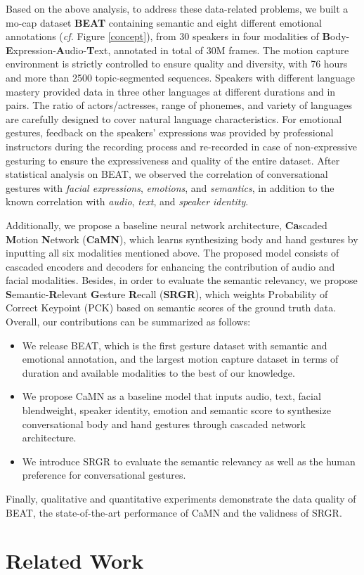\documentclass[runningheads]{llncs}
\begin{document}
Based on the above analysis, to address these data-related problems, we built a mo-cap dataset \textbf{BEAT} containing semantic and eight different emotional annotations (\textit{cf.} Figure \ref{concept}), from 30 speakers in four modalities of \textbf{B}ody-\textbf{E}xpression-\textbf{A}udio-\textbf{T}ext, annotated in total of 30M frames. 
The motion capture environment is strictly controlled to ensure quality and diversity, with 76 hours and more than 2500 topic-segmented sequences. Speakers with different language mastery provided data in three other languages at different durations and in pairs. The ratio of actors/actresses, range of phonemes, and variety of languages are carefully designed to cover natural language characteristics. For emotional gestures, feedback on the speakers' expressions was provided by professional instructors during the recording process and re-recorded in case of non-expressive gesturing to ensure the expressiveness and quality of the entire dataset.
After statistical analysis on BEAT, we observed the correlation of conversational gestures with \textit{facial expressions}, \textit{emotions}, and \textit{semantics}, in addition to the known correlation with \textit{audio}, \textit{text}, and \textit{speaker identity}.  

Additionally, we propose a baseline neural network architecture,  \textbf{Ca}scaded \textbf{M}otion \textbf{N}etwork (\textbf{CaMN}), which learns synthesizing body and hand gestures by inputting all six modalities mentioned above. The proposed model consists of cascaded encoders and decoders for enhancing the contribution of audio and facial modalities. Besides, in order to evaluate the semantic relevancy, we propose \textbf{S}emantic-\textbf{R}elevant \textbf{G}esture \textbf{R}ecall (\textbf{SRGR}), which weights Probability of Correct Keypoint (PCK) based on  semantic scores of the ground truth data. Overall, our contributions can be summarized as follows:
\begin{itemize}
\setlength\itemsep{-.1em}
\item We release BEAT, which is the first gesture dataset with semantic and emotional annotation, and the largest motion capture dataset in terms of duration and available modalities to the best of our knowledge.


\item We propose CaMN as a baseline model that inputs audio, text, facial blendweight, speaker identity, emotion and semantic score to synthesize conversational body and hand gestures through cascaded network architecture.

\item  We introduce SRGR to evaluate the semantic relevancy as well as the human preference for conversational gestures. 

\end{itemize}
Finally, qualitative and quantitative experiments demonstrate the data quality of BEAT, the state-of-the-art performance of CaMN and the validness of SRGR. \section{Related Work}
\label{sec:related}
\end{document}
